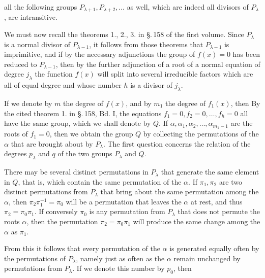 all the following groups $P_{\lambda+1}, P_{\lambda+2}, \ldots$ as well, which are indeed all
divisors of $P_\lambda$, are intransitive.

We must now recall the theorems 1., 2., 3. in \S.\,158 of the first volume. Since
$P_\lambda$ is a normal divisor of $P_{\lambda-1}$, it follows from those theorems
that $P_{\lambda-1}$ is imprimitive, and if by the necessary adjunctions the
group of $f(x) = 0$ has been reduced to $P_{\lambda-1}$, then by the further
adjunction of a root of a normal equation of degree $j_\lambda$ the function
$f(x)$ will split into several irreducible factors
which are all of equal degree and whose number $h$ is a divisor of
$j_\lambda$.

If we denote by $m$ the degree of $f(x)$, and by $m_1$ the degree of $f_1(x)$, then
By the cited theorem 1. in \S.\,158, Bd. I, the equations
$f_1 = 0, f_2 = 0, \ldots, f_h = 0$ all have the same group, which we shall denote
by $Q$. If $\alpha, \alpha_1, \alpha_2, \ldots, \alpha_{m_1-1}$ are the roots of
$f_1 = 0$, then we obtain the group $Q$ by collecting the permutations of the $\alpha$
that are brought about by $P_\lambda$. The first question concerns
the relation of the degrees $p_\lambda$ and $q$ of the two groups $P_\lambda$ and $Q$.

There may be several distinct permutations in $P_\lambda$ that generate the same
element in $Q$, that is, which contain the same permutation of the $\alpha$.
If $\pi_1, \pi_2$ are two distinct permutations from $P_\lambda$ that bring about
the same permutation among the $\alpha$, then $\pi_2 \pi_1^{-1} = \pi_0$ will be a
permutation that leaves the $\alpha$ at rest, and thus
$\pi_2 = \pi_0 \pi_1$. If conversely $\pi_0$ is any permutation from
$P_\lambda$ that does not permute the roots $\alpha$, then the permutation
$\pi_2 = \pi_0 \pi_1$ will produce the same change among the $\alpha$ as $\pi_1$.

From this it follows that every permutation of the $\alpha$ is generated equally often by the
permutations of $P_\lambda$, namely just as often as the $\alpha$
remain unchanged by permutations from $P_\lambda$. If we denote this number
by $p_0$, then
